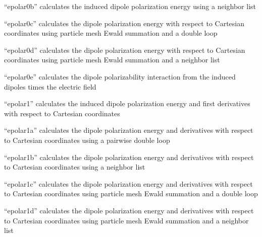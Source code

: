 \documentclass[letterpaper,11pt,english]{sphinxmanual}
\begin{document}
\sphinxAtStartPar
{}

\sphinxAtStartPar
“epolar0b” calculates the induced dipole polarization energy using a neighbor list

\sphinxAtStartPar
{}

\sphinxAtStartPar
“epolar0c” calculates the dipole polarization energy with respect to Cartesian coordinates using particle mesh Ewald summation and a double loop

\sphinxAtStartPar
{}

\sphinxAtStartPar
“epolar0d” calculates the dipole polarization energy with respect to Cartesian coordinates using particle mesh Ewald summation and a neighbor list

\sphinxAtStartPar
{}

\sphinxAtStartPar
“epolar0e” calculates the dipole polarizability interaction from the induced dipoles times the electric field

\sphinxAtStartPar
{}

\sphinxAtStartPar
“epolar1” calculates the induced dipole polarization energy and first derivatives with respect to Cartesian coordinates

\sphinxAtStartPar
{}

\sphinxAtStartPar
“epolar1a” calculates the dipole polarization energy and derivatives with respect to Cartesian coordinates using a pairwise double loop

\sphinxAtStartPar
{}

\sphinxAtStartPar
“epolar1b” calculates the dipole polarization energy and derivatives with respect to Cartesian coordinates using a neighbor list

\sphinxAtStartPar
{}

\sphinxAtStartPar
“epolar1c” calculates the dipole polarization energy and derivatives with respect to Cartesian coordinates using particle mesh Ewald summation and a double loop

\sphinxAtStartPar
{}

\sphinxAtStartPar
“epolar1d” calculates the dipole polarization energy and derivatives with respect to Cartesian coordinates using particle mesh Ewald summation and a neighbor list
\end{document}

